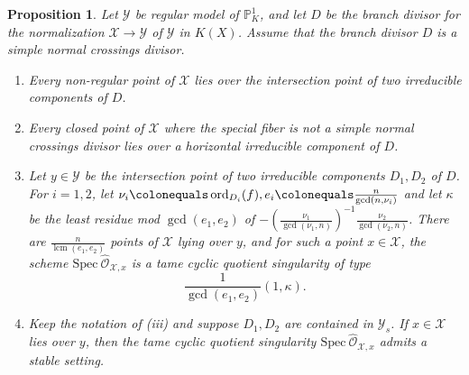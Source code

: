 \documentclass[12pt]{amsart}
\numberwithin{equation}{section}
\newtheorem{prop}[equation]{Proposition}
\theoremstyle{definition}
\newcommand{\mc}[1]{\mathcal{#1}}
\renewcommand{\O}{\mathcal{O}}
\renewcommand{\P}{\mathbb P}
\newcommand{\Spec}{\mathrm{Spec} \ }
\newcommand{\X}{\mathcal{X}}
\DeclareMathOperator{\lcm}{lcm}
\DeclareMathOperator{\ord}{ord}
\begin{document}
\begin{prop}\label{prop: structure of points upstairs}
    Let $\mc{Y}$ be regular model of $\P^1_K$,
    and let $D$ be the branch divisor for the normalization
    $\mc{X}\to\mc{Y}$ of $\mc{Y}$ in $K(X)$. Assume that the
    branch divisor $D$ is a simple normal crossings divisor.
    \begin{enumerate}[\upshape (i)]
        \item Every non-regular point of $\mc{X}$ lies over the intersection point of two irreducible components of $D$.
        \item Every closed point of $\mc{X}$ where the special fiber is not a simple normal crossings divisor lies over a horizontal irreducible component of $D$.
        \item\label{prop:whatappears} Let $y\in\mc{Y}$ be the intersection point of two
          irreducible components $D_1,D_2$ of $D$. For $i=1,2$, let
          $\nu_i \colonequals \ord_{D_i}(f), e_i \colonequals \frac{n}{\gcd(n,\nu_i)}$ and let $\kappa$ be the least residue mod $\gcd(e_1,e_2)$ of $-\left(\frac{\nu_1}{\gcd(\nu_1,n)}\right)^{-1}\frac{\nu_2}{\gcd(\nu_2,n)}$. There are
          $\frac{n}{\lcm(e_1,e_2)}$ points of $\mc{X}$ lying over $y$, and for such a point $x\in\mc{X}$, the scheme $\Spec \hat{\O}_{\mc{X},x}$ is a tame cyclic quotient singularity of type
        \[\frac{1}{\gcd(e_1,e_2)}(1,\kappa).\]
        \item Keep the notation of (iii) and suppose $D_1,D_2$ are contained in $\mc{Y}_s$. If $x\in\mc{X}$ lies over $y$, then the tame cyclic quotient singularity $\Spec \hat{\O}_{\mc{X},x}$ admits a stable setting.
    \end{enumerate}
  \end{prop}
\end{document}
